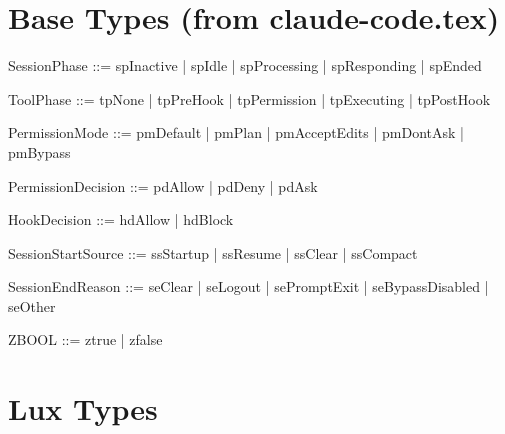 \documentclass[a4paper,10pt,fleqn]{article}
\begin{document}
\section{Base Types (from claude-code.tex)}

\begin{zed}
\end{zed}

\begin{zed}
  SessionPhase ::= spInactive | spIdle | spProcessing | spResponding | spEnded
\end{zed}

\begin{zed}
  ToolPhase ::= tpNone | tpPreHook | tpPermission | tpExecuting | tpPostHook
\end{zed}

\begin{zed}
  PermissionMode ::= pmDefault | pmPlan | pmAcceptEdits | pmDontAsk | pmBypass
\end{zed}

\begin{zed}
  PermissionDecision ::= pdAllow | pdDeny | pdAsk
\end{zed}

\begin{zed}
  HookDecision ::= hdAllow | hdBlock
\end{zed}

\begin{zed}
  SessionStartSource ::= ssStartup | ssResume | ssClear | ssCompact
\end{zed}

\begin{zed}
  SessionEndReason ::= seClear | seLogout | sePromptExit | seBypassDisabled | seOther
\end{zed}

\begin{zed}
  ZBOOL ::= ztrue | zfalse
\end{zed}

\section{Lux Types}

\begin{zed}
\end{zed}
\end{document}
